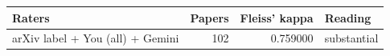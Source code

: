 \begin{tabular}{lrrl}
\toprule
Raters & Papers & Fleiss' kappa & Reading \\
\midrule
arXiv label + You (all) + Gemini & 102 & 0.759000 & substantial \\
\bottomrule
\end{tabular}
